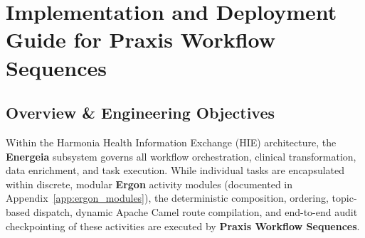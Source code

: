 
\chapter{Implementation and Deployment Guide for Praxis Workflow Sequences}
\label{app:praxis_workflow}

\section{Overview \& Engineering Objectives}
\label{sec:praxis_guide_overview}

Within the Harmonia Health Information Exchange (HIE) architecture, the \textbf{Energeia} subsystem governs all workflow orchestration, clinical transformation, data enrichment, and task execution. While individual tasks are encapsulated within discrete, modular \textbf{Ergon} activity modules (documented in Appendix~\ref{app:ergon_modules}), the deterministic composition, ordering, topic-based dispatch, dynamic Apache Camel route compilation, and end-to-end audit checkpointing of these activities are executed by \textbf{Praxis Workflow Sequences}.

